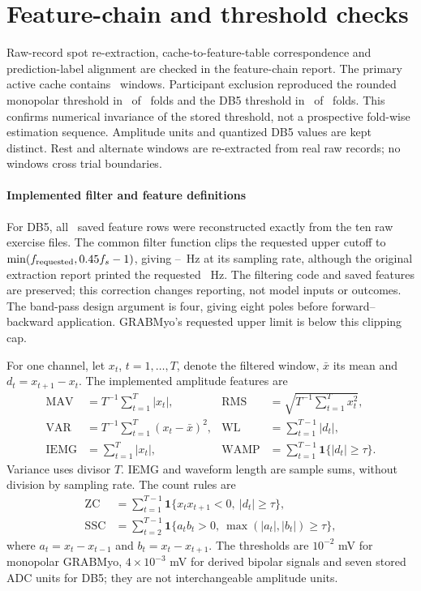 \documentclass{iopjournal}
\begin{document}
\section{Feature-chain and threshold checks}
Raw-record spot re-extraction, cache-to-feature-table correspondence and prediction-label alignment are checked in the feature-chain report. The primary active cache contains \GRABMyoActiveWindows\ windows. Participant exclusion reproduced the rounded monopolar threshold in \LOOMonoIdentical\ of \LOOMonoFolds\ folds and the DB5 threshold in \LOODBFiveIdentical\ of \LOODBFiveFolds\ folds. This confirms numerical invariance of the stored threshold, not a prospective fold-wise estimation sequence. Amplitude units and quantized DB5 values are kept distinct. Rest and alternate windows are re-extracted from real raw records; no windows cross trial boundaries.

\paragraph{Implemented filter and feature definitions}
For DB5, all \RevDBFiveFeatureRows\ saved feature rows were reconstructed exactly from the ten raw exercise files. The common filter function clips the requested upper cutoff to $\min(f_{\rm requested},0.45f_s-1)$, giving \RevDBFiveBandLow--\RevDBFiveBandHigh\ Hz at its sampling rate, although the original extraction report printed the requested \RevDBFiveBandRequestedHigh\ Hz. The filtering code and saved features are preserved; this correction changes reporting, not model inputs or outcomes. The band-pass design argument is four, giving eight poles before forward--backward application. GRABMyo's requested upper limit is below this clipping cap.

For one channel, let $x_t$, $t=1,\ldots,T$, denote the filtered window, $\bar x$ its mean and $d_t=x_{t+1}-x_t$. The implemented amplitude features are
\begin{align*}
\mathrm{MAV}&=T^{-1}\sum_{t=1}^T|x_t|,&
\mathrm{RMS}&=\sqrt{T^{-1}\sum_{t=1}^Tx_t^2},\\
\mathrm{VAR}&=T^{-1}\sum_{t=1}^T(x_t-\bar x)^2,&
\mathrm{WL}&=\sum_{t=1}^{T-1}|d_t|,\\
\mathrm{IEMG}&=\sum_{t=1}^T|x_t|,&
\mathrm{WAMP}&=\sum_{t=1}^{T-1}\mathbf{1}\{|d_t|\ge\tau\}.
\end{align*}
Variance uses divisor $T$. IEMG and waveform length are sample sums, without division by sampling rate. The count rules are
\begin{align*}
\mathrm{ZC}&=\sum_{t=1}^{T-1}\mathbf{1}\{x_tx_{t+1}<0,\ |d_t|\ge\tau\},\\
\mathrm{SSC}&=\sum_{t=2}^{T-1}\mathbf{1}\{a_tb_t>0,\ \max(|a_t|,|b_t|)\ge\tau\},
\end{align*}
where $a_t=x_t-x_{t-1}$ and $b_t=x_t-x_{t+1}$. The thresholds are $10^{-2}$ mV for monopolar GRABMyo, $4\times10^{-3}$ mV for derived bipolar signals and seven stored ADC units for DB5; they are not interchangeable amplitude units.
\end{document}
